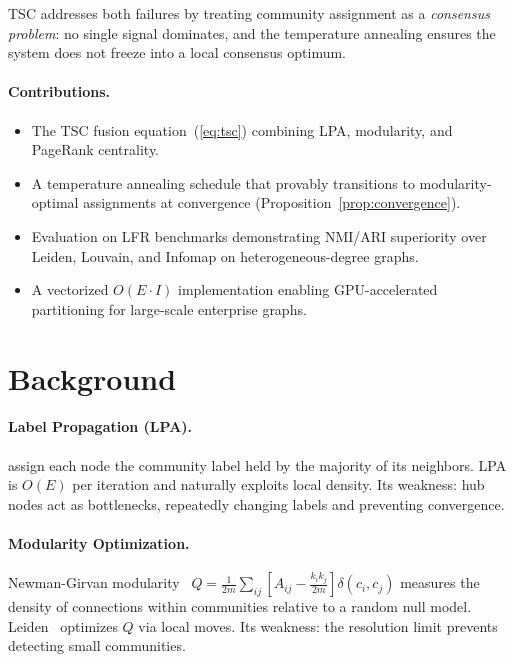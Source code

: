\documentclass[10pt,twocolumn]{article}
\begin{document}
TSC addresses both failures by treating community assignment as a \emph{consensus problem}:
no single signal dominates, and the temperature annealing ensures the system does not
freeze into a local consensus optimum.

\paragraph{Contributions.}
\begin{itemize}
  \item The TSC fusion equation~(\ref{eq:tsc}) combining LPA, modularity, and PageRank centrality.
  \item A temperature annealing schedule that provably transitions to modularity-optimal
        assignments at convergence (Proposition~\ref{prop:convergence}).
  \item Evaluation on LFR benchmarks demonstrating NMI/ARI superiority over Leiden,
        Louvain, and Infomap on heterogeneous-degree graphs.
  \item A vectorized $O(E \cdot I)$ implementation enabling GPU-accelerated partitioning
        for large-scale enterprise graphs.
\end{itemize}

\section{Background}
\label{sec:background}

\paragraph{Label Propagation (LPA).}
\citet{raghavan2007lpa} assign each node the community label held by the majority of its
neighbors. LPA is $O(E)$ per iteration and naturally exploits local density. Its weakness:
hub nodes act as bottlenecks, repeatedly changing labels and preventing convergence.

\paragraph{Modularity Optimization.}
Newman-Girvan modularity~\cite{newman2004modularity} $Q = \frac{1}{2m}\sum_{ij}[A_{ij} -
\frac{k_i k_j}{2m}]\delta(c_i, c_j)$ measures the density of connections within
communities relative to a random null model. Leiden~\cite{traag2019louvain} optimizes
$Q$ via local moves. Its weakness: the resolution limit prevents detecting small communities.
\end{document}
